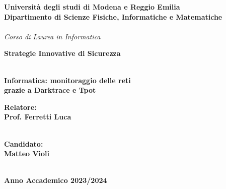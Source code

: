 \documentclass[12pt,a4paper,oneside,onecolumn,openright]{book}
\begin{document}
	\begin{titlepage}
		\begin{center}
			{
				\large
				\textbf{Università  degli studi di Modena e Reggio Emilia} \\
				\textbf{Dipartimento di Scienze Fisiche, Informatiche e Matematiche} \\
				\hspace*{0cm} \hrulefill \hspace*{0cm} \\
				\emph{Corso di Laurea in Informatica}
				
				
				
				\huge{\bf Strategie Innovative di Sicurezza}}\\
			\vspace{3mm}
			{\huge{\bf Informatica: monitoraggio delle reti}}\\
			\vspace{3mm}
			\vspace{3mm}
			{\huge{\bf  grazie a Darktrace e Tpot}}\\
			\vspace{3mm}
			\vspace{3mm}
			
		\end{center}
		
		\vspace{40mm}
		\par
		\noindent
		\begin{minipage}[t]{0.47\textwidth}
			{\large{\bf Relatore:\\
					Prof.
					Ferretti Luca}}\\ 
			\\
		\end{minipage}
		\hfill
		\begin{minipage}[t]{0.47\textwidth}\raggedleft
			{\large{\bf Candidato:\\
					Matteo Violi}}
		\end{minipage}
		\vspace{20mm}
		\begin{center}
			\hspace*{0cm} \hrulefill \hspace*{0cm} \\
			{\large{\bf 
					Anno Accademico 2023/2024}}
		\end{center}
		
	\end{titlepage}
	
\end{document}
